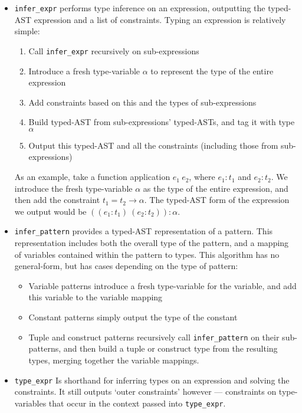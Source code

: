 \documentclass[12pt,twoside,notitlepage]{report}
\newcommand{\camlinline}{\texttt}
\begin{document}
\begin{itemize}
	\item \camlinline{infer_expr} performs type inference on an expression, outputting the typed-AST expression and a list of constraints. Typing an expression is relatively simple:
	\begin{enumerate}
		\item Call \camlinline{infer_expr} recursively on sub-expressions
		\item Introduce a fresh type-variable $\alpha$ to represent the type of the entire expression
		\item Add constraints based on this and the types of sub-expressions
		\item Build typed-AST from sub-expressions' typed-ASTs, and tag it with type $\alpha$
		\item Output this typed-AST and all the constraints (including those from sub-expressions)
	\end{enumerate}
	As an example, take a function application $e_1\ e_2$, where $e_1 : t_1$ and $e_2 : t_2$. We introduce the fresh type-variable $\alpha$ as the type of the entire expression, and then add the constraint $t_1 = t_2 \rightarrow \alpha$. The typed-AST form of the expression we output would be $((e_1 : t_1)\ (e_2 : t_2)) : \alpha$.
	
	\item \camlinline{infer_pattern} provides a typed-AST representation of a pattern. This representation includes both the overall type of the pattern, and a mapping of variables contained within the pattern to types. This algorithm has no general-form, but has cases depending on the type of pattern:
	\begin{itemize}
		\item Variable patterns introduce a fresh type-variable for the variable, and add this variable to the variable mapping
		\item Constant patterns simply output the type of the constant
		\item Tuple and construct patterns recursively call \camlinline{infer_pattern} on their sub-patterns, and then build a tuple or construct type from the resulting types, merging together the variable mappings.
	\end{itemize}

	\item \camlinline{type_expr} Is shorthand for inferring types on an expression and solving the constraints. It still outputs `outer constraints' however --- constraints on type-variables that occur in the context passed into \camlinline{type_expr}.
	

\end{itemize}
\end{document}
